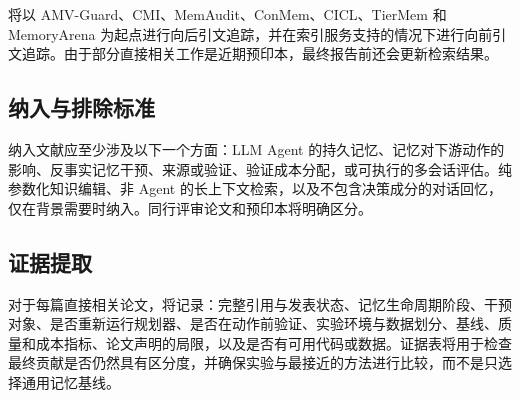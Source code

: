 \documentclass[11pt]{article}
\begin{document}
将以 AMV-Guard、CMI、MemAudit、ConMem、CICL、TierMem 和 MemoryArena 为起点进行向后引文追踪，并在索引服务支持的情况下进行向前引文追踪。由于部分直接相关工作是近期预印本，最终报告前还会更新检索结果。

\subsection{纳入与排除标准}

纳入文献应至少涉及以下一个方面：LLM Agent 的持久记忆、记忆对下游动作的影响、反事实记忆干预、来源或验证、验证成本分配，或可执行的多会话评估。纯参数化知识编辑、非 Agent 的长上下文检索，以及不包含决策成分的对话回忆，仅在背景需要时纳入。同行评审论文和预印本将明确区分。

\subsection{证据提取}

对于每篇直接相关论文，将记录：完整引用与发表状态、记忆生命周期阶段、干预对象、是否重新运行规划器、是否在动作前验证、实验环境与数据划分、基线、质量和成本指标、论文声明的局限，以及是否有可用代码或数据。证据表将用于检查最终贡献是否仍然具有区分度，并确保实验与最接近的方法进行比较，而不是只选择通用记忆基线。



\end{document}
